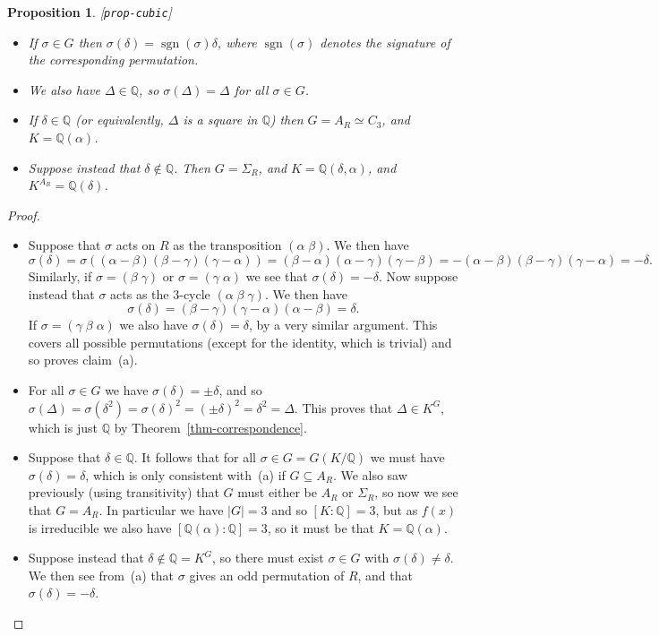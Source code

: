 \documentclass{amsart}
\newcommand{\lbl}[1]{\label{#1}\textup{[\texttt{#1}]}\ \\}
\newcommand{\lbl}{\label}
\newcommand{\sgn}	{\operatorname{sgn}}
\newcommand{\Q}         {{\mathbb{Q}}}
\newcommand{\al}        {\alpha}
\newcommand{\bt}        {\beta}
\newcommand{\gm}        {\gamma}
\newcommand{\dl}        {\delta}
\newcommand{\sg}        {\sigma}
\newcommand{\Dl}        {\Delta}
\newcommand{\Sg}        {\Sigma}
\newcommand{\sse}       {\subseteq}
\renewcommand{\:}{\colon}
\newtheorem{proposition}[theorem]{Proposition}
\theoremstyle{definition}
\begin{document}
\begin{proposition}\lbl{prop-cubic}
 \begin{itemize}
  \item[(a)] If $\sg\in G$ then $\sg(\dl)=\sgn(\sg)\dl$, where
   $\sgn(\sg)$ denotes the signature of the corresponding
   permutation.
  \item[(b)] We also have $\Dl\in\Q$, so $\sg(\Dl)=\Dl$ for all
   $\sg\in G$.
  \item[(c)] If $\dl\in\Q$ (or equivalently, $\Dl$ is a square in
   $\Q$) then $G=A_R\simeq C_3$, and $K=\Q(\al)$.
  \item[(d)] Suppose instead that $\dl\not\in\Q$.  Then $G=\Sg_R$, and
   $K=\Q(\dl,\al)$, and $K^{A_R}=\Q(\dl)$.
 \end{itemize}
\end{proposition}
\begin{proof}
 \begin{itemize}
  \item[(a)] Suppose that $\sg$ acts on $R$ as the transposition
   $(\al\;\bt)$.  We then have 
   \[ \sg(\dl)=\sg((\al-\bt)(\bt-\gm)(\gm-\al)) = 
       (\bt-\al)(\al-\gm)(\gm-\bt) = 
       -(\al-\bt)(\bt-\gm)(\gm-\al) = -\dl.
   \]
   Similarly, if $\sg=(\bt\;\gm)$ or $\sg=(\gm\;\al)$ we see that
   $\sg(\dl)=-\dl$.  Now suppose instead that $\sg$ acts as the
   $3$-cycle $(\al\;\bt\;\gm)$.  We then have
   \[ \sg(\dl)=(\bt-\gm)(\gm-\al)(\al-\bt)=\dl. \]
   If $\sg=(\gm\;\bt\;\al)$ we also have $\sg(\dl)=\dl$, by a very
   similar argument.  This covers all possible permutations (except for
   the identity, which is trivial) and so proves claim~(a).
  \item[(b)] For all $\sg\in G$ we have $\sg(\dl)=\pm\dl$, and so
   $\sg(\Dl)=\sg(\dl^2)=\sg(\dl)^2=(\pm\dl)^2=\dl^2=\Dl$.  This proves
   that $\Dl\in K^G$, which is just $\Q$ by
   Theorem~\ref{thm-correspondence}.
  \item[(c)] Suppose that $\dl\in\Q$.  It follows that for all
   $\sg\in G=G(K/\Q)$ we must have $\sg(\dl)=\dl$, which is only
   consistent with~(a) if $G\sse A_R$.  We also saw previously (using
   transitivity) that $G$ must either be $A_R$ or $\Sg_R$, so now we
   see that $G=A_R$.  In particular we have $|G|=3$ and so $[K:\Q]=3$,
   but as $f(x)$ is irreducible we also have $[\Q(\al):\Q]=3$, so it
   must be that $K=\Q(\al)$.
  \item[(d)] Suppose instead that $\dl\not\in\Q=K^G$, so there must
   exist $\sg\in G$ with $\sg(\dl)\neq\dl$.  We then see from~(a) that
   $\sg$ gives an odd permutation of $R$, and that $\sg(\dl)=-\dl$.

\end{itemize}
\end{proof}
\end{document}
